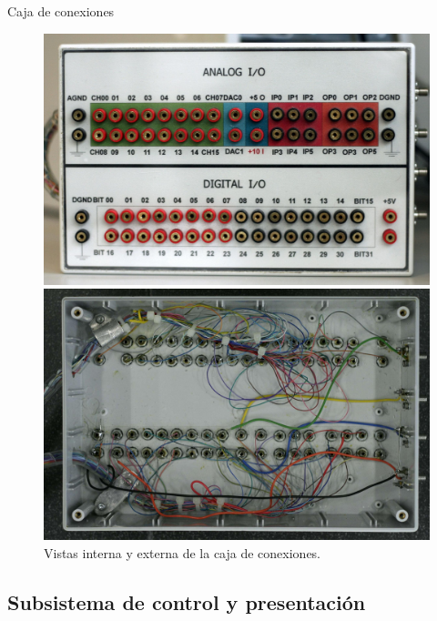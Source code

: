 \documentclass[utf8, compress]			{beamer}
\begin{document}
\begin{frame}{Caja de conexiones}
    \begin{figure}
	\hfill
	\begin{minipage}[top][\exterior][c]{\interior}
	    \includegraphics[angle=90]{exterior.jpg}
	\end{minipage}
	\hspace{1.5em}
	\begin{minipage}[top][\exterior][c]{\interior}
	    \includegraphics[angle=90]{interior.jpg}
	\end{minipage}
	\hfill
	\caption{Vistas interna y externa de la caja de conexiones.}
	\label{fig:connectionbox}
    \end{figure}
\end{frame}


\subsection{Subsistema de control y presentación}
\end{document}
